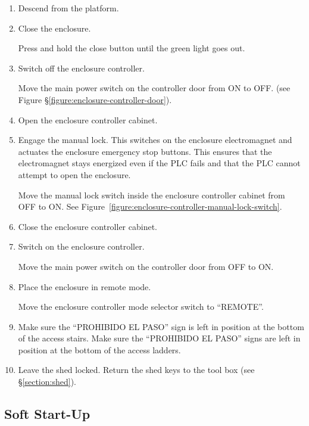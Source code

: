 \begin{enumerate}
\fi

\item
Descend from the platform.

\item 
Close the enclosure.

Press and hold the close button until the green light goes out.

\item
Switch off the enclosure controller.

Move the main power switch on the controller door from ON to OFF. (see Figure \S\ref{figure:enclosure-controller-door}).
\item
Open the enclosure controller cabinet.

\item
Engage the manual lock. This switches on the enclosure electromagnet and actuates the enclosure emergency stop buttons. This ensures that the electromagnet stays energized even if the PLC fails and that the PLC cannot attempt to open the enclosure.

Move the manual lock switch inside the enclosure controller cabinet from OFF to ON. See Figure~\ref{figure:enclosure-controller-manual-lock-switch}.

\item
Close the enclosure controller cabinet.

\item
Switch on the enclosure controller.

Move the main power switch on the controller door from OFF to ON.

\item
Place the enclosure in remote mode.

Move the enclosure controller mode selector switch to “REMOTE”.

\item
\ifcoatli
Make sure the “PROHIBIDO EL PASO” sign is left in position at the bottom of the access stairs.
\fi
\ifddoti
Make sure the “PROHIBIDO EL PASO” signs are left in position at the bottom of the access ladders.
\fi

\item
Leave the shed locked. Return the shed keys to the tool box (see \S\ref{section:shed}).

\end{enumerate}

\subsection{Soft Start-Up}
\label{section:soft-start-up}


